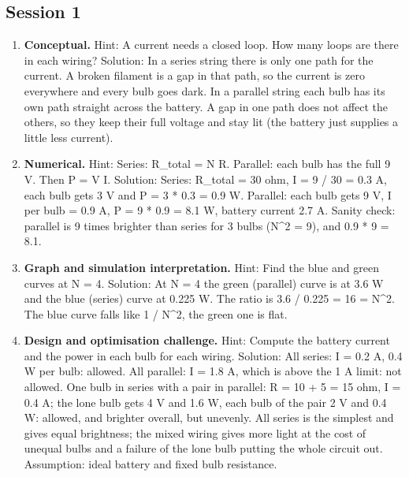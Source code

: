 \documentclass[11pt,a4paper]{article}
\begin{document}
\subsection*{Session 1}
\begin{enumerate}[nosep]
\item \textbf{Conceptual.} Hint: A current needs a closed loop. How many loops are there in each wiring? Solution: In a series string there is only one path for the current. A broken filament is a gap in that path, so the current is zero everywhere and every bulb goes dark. In a parallel string each bulb has its own path straight across the battery. A gap in one path does not affect the others, so they keep their full voltage and stay lit (the battery just supplies a little less current).
\item \textbf{Numerical.} Hint: Series: R\_total = N R. Parallel: each bulb has the full 9 V. Then P = V I. Solution: Series: R\_total = 30 ohm, I = 9 / 30 = 0.3 A, each bulb gets 3 V and P = 3 * 0.3 = 0.9 W. Parallel: each bulb gets 9 V, I per bulb = 0.9 A, P = 9 * 0.9 = 8.1 W, battery current 2.7 A. Sanity check: parallel is 9 times brighter than series for 3 bulbs (N\textasciicircum{}2 = 9), and 0.9 * 9 = 8.1.
\item \textbf{Graph and simulation interpretation.} Hint: Find the blue and green curves at N = 4. Solution: At N = 4 the green (parallel) curve is at 3.6 W and the blue (series) curve at 0.225 W. The ratio is 3.6 / 0.225 = 16 = N\textasciicircum{}2. The blue curve falls like 1 / N\textasciicircum{}2, the green one is flat.
\item \textbf{Design and optimisation challenge.} Hint: Compute the battery current and the power in each bulb for each wiring. Solution: All series: I = 0.2 A, 0.4 W per bulb: allowed. All parallel: I = 1.8 A, which is above the 1 A limit: not allowed. One bulb in series with a pair in parallel: R = 10 + 5 = 15 ohm, I = 0.4 A; the lone bulb gets 4 V and 1.6 W, each bulb of the pair 2 V and 0.4 W: allowed, and brighter overall, but unevenly. All series is the simplest and gives equal brightness; the mixed wiring gives more light at the cost of unequal bulbs and a failure of the lone bulb putting the whole circuit out. Assumption: ideal battery and fixed bulb resistance.
\end{enumerate}
\end{document}
